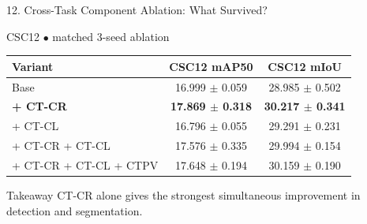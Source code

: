 \documentclass[aspectratio=169,11pt]{beamer}
\begin{document}
\begin{frame}{12. Cross-Task Component Ablation: What Survived?}
{\scriptsize
\centering
CSC12 $\bullet$ matched 3-seed ablation
\par
}
\begin{center}
\small
\begin{tabular}{lcc}
\toprule
\textbf{Variant} & \textbf{CSC12 mAP50} & \textbf{CSC12 mIoU} \\
\midrule
Base & 16.999 $\pm$ 0.059 & 28.985 $\pm$ 0.502 \\
\textbf{+ CT-CR} & \textbf{17.869 $\pm$ 0.318} & \textbf{30.217 $\pm$ 0.341} \\
+ CT-CL & 16.796 $\pm$ 0.055 & 29.291 $\pm$ 0.231 \\
+ CT-CR + CT-CL & 17.576 $\pm$ 0.335 & 29.994 $\pm$ 0.154 \\
+ CT-CR + CT-CL + CTPV & 17.648 $\pm$ 0.194 & 30.159 $\pm$ 0.190 \\
\bottomrule
\end{tabular}
\end{center}

\vspace{0.5em}
\begin{block}{Takeaway}
CT-CR alone gives the strongest simultaneous improvement in detection and segmentation.
\end{block}
\end{frame}



\end{document}
